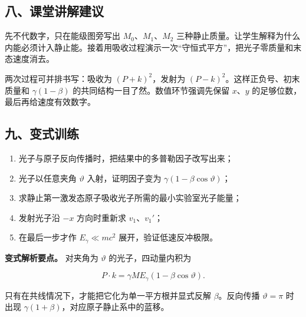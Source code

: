 \documentclass[12pt,a4paper,UTF8]{ctexart}
\newcommand{\tightlist}{\setlength{\itemsep}{0pt}\setlength{\parskip}{0pt}}
\begin{document}
\subsection{八、课堂讲解建议}\label{ux516bux8bfeux5802ux8bb2ux89e3ux5efaux8bae-7}

先不代数字，只在能级图旁写出 \(M_0\)、\(M_1\)、\(M_2\)
三种静止质量。让学生解释为什么内能必须计入静止能。接着用吸收过程演示一次``守恒式平方''，把光子零质量和末态速度消去。

两次过程可并排书写：吸收为 \((P+k)^2\)，发射为
\((P-k)^2\)。这样正负号、初末质量和 \(\gamma(1-\beta)\)
的共同结构一目了然。数值环节强调先保留 \(x\)、\(y\)
的足够位数，最后再给速度有效数字。

\begingroup
\samepage

\subsection{九、变式训练}\label{ux4e5dux53d8ux5f0fux8badux7ec3-7}

\begin{enumerate}
\def\labelenumi{\arabic{enumi}.}
\tightlist
\item
  光子与原子反向传播时，把结果中的多普勒因子改写出来；
\item
  光子以任意夹角 \(\vartheta\) 入射，证明因子变为
  \(\gamma(1-\beta\cos\vartheta)\)；
\item
  求静止第一激发态原子吸收光子所需的最小实验室光子能量；
\item
  发射光子沿 \(-x\) 方向时重新求 \(v_1\)、\(v_1'\)；
\item
  在最后一步才作 \(E_\gamma\ll mc^2\) 展开，验证低速反冲极限。
\end{enumerate}

\textbf{变式解析要点。} 对夹角为 \(\vartheta\) 的光子，四动量内积为

\[
P\cdot k
=\gamma ME_\gamma(1-\beta\cos\vartheta).
\]

只有在共线情况下，才能把它化为单一平方根并显式反解 \(\beta\)。反向传播
\(\vartheta=\pi\) 时出现 \(\gamma(1+\beta)\)，对应原子静止系中的蓝移。

\endgroup
\end{document}
